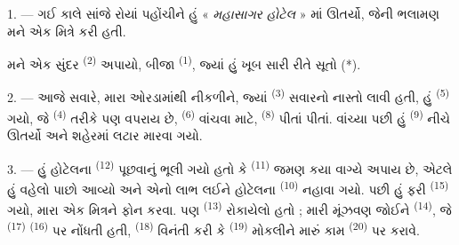 %


\VUsaut{3.0mm}
\VUsaut{1.6mm}
\VUsaut{2.0mm}
\VUsaut{3.4mm}

1. --- ગઈ કાલે સાંજે રોયાં પહોંચીને હું « \textit{મહાસાગર હોટેલ} » માં
ઊતર્યો, જેની ભલામણ મને એક મિત્રે કરી હતી.

મને એક સુંદર  \textsuperscript{(2)} અપાયો, બીજા
 \textsuperscript{(1)}, જ્યાં હું ખૂબ સારી રીતે સૂતો (*).

2. --- આજે સવારે, મારા ઓરડામાંથી નીકળીને, જ્યાં 
\textsuperscript{(3)} સવારનો નાસ્તો લાવી હતી, હું  \textsuperscript{(5)} ગયો, જે 
\textsuperscript{(4)} તરીકે પણ વપરાય છે, 
\textsuperscript{(6)} વાંચવા માટે, 
\textsuperscript{(8)} પીતાં પીતાં. વાંચ્યા પછી હું 
\textsuperscript{(9)} નીચે ઊતર્યો અને શહેરમાં લટાર મારવા ગયો.

3. --- હું હોટેલના  \textsuperscript{(12)} પૂછવાનું
ભૂલી ગયો હતો કે  \textsuperscript{(11)} જમણ કયા
વાગ્યે અપાય છે, એટલે હું વહેલો પાછો આવ્યો અને એનો લાભ લઈને હોટેલના
 \textsuperscript{(10)} નહાવા ગયો. પછી હું ફરી
 \textsuperscript{(15)} ગયો, મારા એક મિત્રને ફોન કરવા.
પણ  \textsuperscript{(13)} રોકાયેલો હતો ; મારી મૂંઝવણ
જોઈને  \textsuperscript{(14)}, જે 
\textsuperscript{(17)}  \textsuperscript{(16)}
પર નોંધતી હતી,  \textsuperscript{(18)} વિનંતી કરી કે
 \textsuperscript{(19)} મોકલીને મારું કામ
 \textsuperscript{(20)} પર કરાવે.

